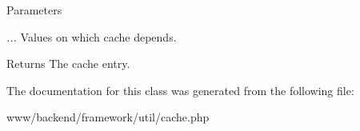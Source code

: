 \begin{DoxyParams}{Parameters}
\item[{\em ...}]Values on which cache depends.\end{DoxyParams}
\begin{DoxyReturn}{Returns}
The cache entry. 
\end{DoxyReturn}


The documentation for this class was generated from the following file:\begin{DoxyCompactItemize}
\item 
www/backend/framework/util/cache.php\end{DoxyCompactItemize}
